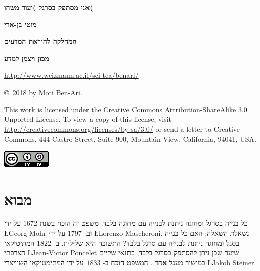 \documentclass[12pt,a4paper]{article}
\begin{document}
\thispagestyle{empty}


\begin{center}
\textbf{\Huge%
אני מסתפק בסרגל )ועוד משהו(
}

\bigskip
\bigskip
\bigskip
\bigskip

\textbf{\Large מוטי בן-ארי}

\bigskip

\textbf{\Large המחלקה להוראת המדעים}

\bigskip

\textbf{\Large מכון ויצמן למדע}

\bigskip

\url{http://www.weizmann.ac.il/sci-tea/benari/}
\end{center}

\bigskip
\bigskip
\bigskip
\bigskip

\begin{center}
\copyright{}\  2018 by Moti Ben-Ari.
\end{center}


{\small This work is licensed under the Creative Commons Attribution-ShareAlike 3.0 Unported License. To view a copy of this license, visit \url{http://creativecommons.org/licenses/by-sa/3.0/} or send a letter to Creative Commons, 444 Castro Street, Suite 900, Mountain View, California, 94041, USA.}

\bigskip

\begin{center}
\includegraphics[width=.2\textwidth]{../by-sa.png}
\end{center}


\newpage


\section{%
מבוא
}\label{s.intro}

כל בנייה בסרגל ומחוגה ניתנת לבנייה עם מחוגה בלבד. משפט זה הוכח בשנת 
$1672$
על ידי
\L{Georg Mohr}
וב-
$1797$
על ידי
\L{Lorenzo Mascheroni}.
נשאלת השאלה: האם כל בנייה בסגל ומחוגה ניתנת לבנייה עם סרגל בלבד? התשובה היא שלילית. ב-
$1822$
המתיטיקאי הצרפתי
\L{Jean-Victor Poncelet}
שיער שכן ניתן להסתפק בסרגל בלבד, בתנאי שקיים במישור מעגל
\textbf{%
אחד%
}.
המשפט הוכח ב-
$1833$
על ידי המתימטיקאי השוויצרי
\L{Jakob Steiner}.
\end{document}
